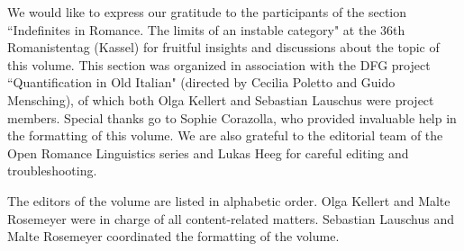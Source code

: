 \addchap{\lsAcknowledgementTitle} 
We would like to express our gratitude to the participants of the section ``Indefinites in Romance. The limits of an instable category" at the 36th Romanistentag (Kassel) for fruitful insights and discussions about the topic of this volume. This section was organized in association with the DFG project “Quantification in Old Italian" (directed by Cecilia Poletto and Guido Mensching), of which both Olga Kellert and Sebastian Lauschus were project members. Special thanks go to Sophie Corazolla, who provided invaluable help in the formatting of this volume. We are also grateful to the editorial team of the Open Romance Linguistics series and Lukas Heeg for careful editing and troubleshooting.

The editors of the volume are listed in alphabetic order. Olga Kellert and Malte Rosemeyer were in charge of all content-related matters. Sebastian Lauschus and Malte Rosemeyer coordinated the formatting of the volume.
